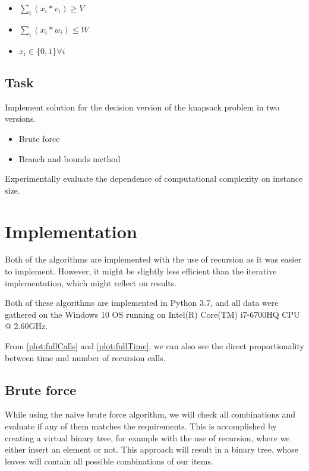 \begin{itemize}
    \item $\sum_i(x_i*v_i) \geq V$
    \item $\sum_i(x_i*w_i) \leq W$
    \item $x_i \in \{0,1\} \forall i$
\end{itemize}

\subsection{Task}
Implement solution for the decision version of the knapsack problem in two versions.

\begin{itemize}
    \item Brute force
    \item Branch and bounds method
\end{itemize}

Experimentally evaluate the dependence of computational complexity on instance size.




\section{Implementation}
Both of the algorithms are implemented with the use of recursion as it was easier to implement. However, it might be slightly less efficient than the iterative implementation, which might reflect on results.

Both of these algorithms are implemented in Python 3.7, and all data were gathered on the Windows 10 OS running on Intel(R) Core(TM) i7-6700HQ CPU @ 2.60GHz.

From \cref{plot:fullCalls} and \cref{plot:fullTime}, we can also see the direct proportionality between time and number of recursion calls.

\subsection{Brute force}
While using the naive brute force algorithm, we will check all combinations and evaluate if any of them matches the requirements. This is accomplished by creating a virtual binary tree, for example with the use of recursion, where we either insert an element or not. This approach will result in a binary tree, whose leaves will contain all possible combinations of our items.

